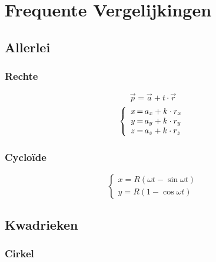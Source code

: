 \newpage
\twocolumn
\section{Frequente Vergelijkingen}
\label{sec:FrequenteVergelijkingen}

\subsection{Allerlei}
\label{sec:Allerlei}

	\subsubsection{Rechte}
  \label{sec:vglRechte}
    \[
      \vec{p} = \vec{a} + t \cdot \vec{r}
    \]
    \[
      \left\{
        \begin{array}[h]{l@{\,=\,}l}
          x & a_x + k \cdot r_x\\
          y & a_y + k \cdot r_y\\
           z & a_z + k \cdot r_z
        \end{array}
      \right.
    \]

  \subsubsection{Cycloïde}
  \label{sec:vglCyclo}
    \[
      \left\{
        \begin{array}{l}
          x = R \left( \omega t - \sin \omega t \right)\\
          y = R \left( 1 - \cos \omega t \right)
        \end{array}
      \right.
    \]


\subsection{Kwadrieken}
\label{sec:Kwadrieken}

  \subsubsection{Cirkel}
  \label{sec:vglCirkel}

